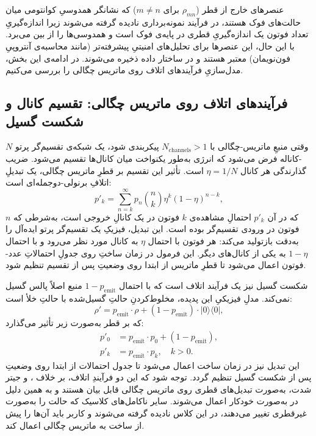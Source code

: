 عنصرهای خارج از قطر ($\rho_{mn}$ برای $m \neq n$) که نشانگر همدوسیِ کوانتومی میان حالت‌های فوک هستند، در فرآیند نمونه‌برداری  نادیده گرفته می‌شوند زیرا اندازه‌گیریِ تعداد فوتون یک اندازه‌گیریِ قطری در پایه‌ی فوک است و همدوسی‌ها را از بین می‌برد. با این حال، این عنصرها برای تحلیل‌های امنیتیِ پیشرفته‌تر (مانند محاسبه‌ی آنتروپیِ فون‌نویمان) معتبر هستند و در ساختار داده ذخیره می‌شوند. در ادامه‌ی این بخش، مدل‌سازیِ فرآیندهای اتلاف روی ماتریس چگالی را بررسی می‌کنیم.

\subsection{فرآیندهای اتلاف روی ماتریس چگالی: تقسیم کانال و شکست گسیل}

وقتی منبعِ ماتریس-چگالی با $N_{\text{channels}} > 1$ پیکربندی شود، یک شبکه‌ی تقسیم‌گر پرتو  $N$-کاناله فرض می‌شود که انرژی به‌طور یکنواخت میان کانال‌ها تقسیم می‌شود. ضریب گذارندگی هر کانال $\eta = 1/N$ است. تأثیر این تقسیم بر قطرِ ماتریس چگالی، یک تبدیلِ اتلافِ برنولی-دوجمله‌ای  است:
\begin{equation}
	p'_k = \sum_{n=k}^{\infty} p_n \binom{n}{k} \eta^k (1-\eta)^{n-k},
	\label{eq:binomial-loss-channel-split}
\end{equation}
که در آن $p'_k$ احتمالِ مشاهده‌ی $k$ فوتون در یک کانالِ خروجی است، به‌شرطی که $n$ فوتون در ورودی تقسیم‌گر بوده است. این تبدیل، فیزیکِ یک تقسیم‌گر پرتو ایده‌آل را به‌دقت بازتولید می‌کند: هر فوتون با احتمال $\eta$ به کانال مورد نظر می‌رود و با احتمال $1-\eta$ به یکی از کانال‌های دیگر. این فرمول در زمان ساختِ  روی جدولِ احتمالاتِ عدد-فوتون  اعمال می‌شود تا قطرِ ماتریس از ابتدا روی وضعیتِ پس از تقسیم تنظیم شود.

شکست گسیل  نیز یک فرآیند اتلاف است که با احتمال $1 - p_{\text{emit}}$ منبع اصلاً پالس گسیل نمی‌کند. مدلِ فیزیکیِ این پدیده، مخلوط‌کردنِ حالتِ گسیل‌شده با حالتِ خلأ است:
\begin{equation}
	\rho' = p_{\text{emit}} \cdot \rho + (1 - p_{\text{emit}}) \cdot |0\rangle\langle 0|,
	\label{eq:emission-failure-mixture}
\end{equation}
که بر قطر به‌صورت زیر تأثیر می‌گذارد:
\begin{align}
	p'_0 &= p_{\text{emit}} \cdot p_0 + (1 - p_{\text{emit}}), \label{eq:emission-failure-p0} \\
	p'_k &= p_{\text{emit}} \cdot p_k, \quad k > 0. \label{eq:emission-failure-pk}
\end{align}
این تبدیل نیز در زمان ساخت اعمال می‌شود تا جدول احتمالات از ابتدا روی وضعیتِ پس از شکست گسیل تنظیم گردد. توجه شود که این دو فرآیندِ اتلاف، بر خلاف ،  و جیتر شدت، به‌صورت تبدیل‌های قطری روی ماتریس چگالی قابل بیان هستند و به همین دلیل در  به‌صورت خودکار اعمال می‌شوند. سایر ناکامل‌های کلاسیک که حالت را به‌صورت غیرقطری تغییر می‌دهند، در این کلاس نادیده گرفته می‌شوند و کاربر باید آن‌ها را پیش از ساخت به ماتریس چگالی اعمال کند.

